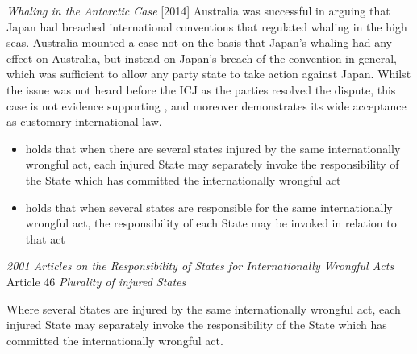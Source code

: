 \begin{casedetails}{\textit{Whaling in the Antarctic Case} [2014]}
    \flushleft
    Australia was successful in arguing that Japan had breached international conventions that regulated whaling in the high seas. Australia mounted a case not on the basis that Japan's whaling had any effect on Australia, but instead on Japan's breach of the convention in general, which was sufficient to allow any party state to take action against Japan. Whilst the issue was not heard before the ICJ as the parties resolved the dispute, this case is not evidence supporting , and moreover demonstrates its wide acceptance as customary international law.
\end{casedetails}

\begin{itemize}
    \item {} holds that when there are several states injured by the same internationally wrongful act, each injured State may separately invoke the responsibility of the State which has committed the internationally wrongful act
    \item {} holds that when several states are responsible for the same internationally wrongful act, the responsibility of each State may be invoked in relation to that act
\end{itemize}

\begin{conventiondetails}{\textit{2001 Articles on the Responsibility of States for Internationally Wrongful Acts} Article 46}
    \flushleft
    \textit{Plurality of injured States}

    \vspace{\baselineskip}

    Where several States are injured by the same internationally wrongful act, each injured State may separately invoke the responsibility of the State which has committed the internationally wrongful act.
\end{conventiondetails}

